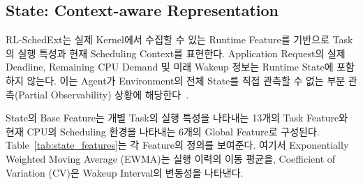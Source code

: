 \subsection{State: Context-aware Representation}
\label{sec:design-state-context-aware-representation}
RL-SchedExt는 실제 Kernel에서 수집할 수 있는 Runtime Feature를 기반으로 Task의 실행 특성과 현재 Scheduling Context를 표현한다.
Application Request의 실제 Deadline, Remaining CPU Demand 및 미래 Wakeup 정보는 Runtime State에 포함하지 않는다.
이는 Agent가 Environment의 전체 State를 직접 관측할 수 없는 부분 관측(Partial Observability) 상황에 해당한다~\cite{kaelbling1998}.

State의 Base Feature는 개별 Task의 실행 특성을 나타내는 13개의
Task Feature와 현재 CPU의 Scheduling 환경을 나타내는 6개의 Global Feature로 구성된다.
Table~\ref{tab:state_features}는 각 Feature의 정의를 보여준다.
여기서 Exponentially Weighted Moving Average (EWMA)는 실행 이력의
이동 평균을, Coefficient of Variation (CV)은 Wakeup Interval의 변동성을
나타낸다.

